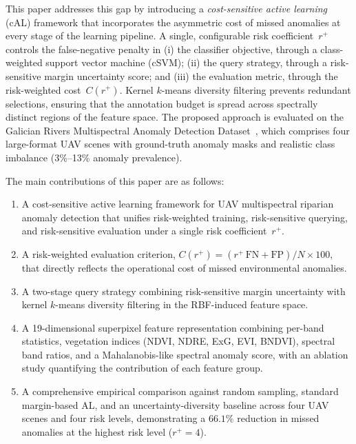 \documentclass[lettersize,journal]{IEEEtran}
\begin{document}
This paper addresses this gap by introducing a \emph{cost-sensitive active
learning} (cAL) framework that incorporates the asymmetric cost of missed
anomalies at every stage of the learning pipeline. A single, configurable
risk coefficient~$r^{+}$ controls the false-negative penalty in (i) the
classifier objective, through a class-weighted support vector machine
(cSVM); (ii) the query strategy, through a risk-sensitive margin
uncertainty score; and (iii) the evaluation metric, through the
risk-weighted cost~$C(r^{+})$. Kernel $k$-means diversity filtering
prevents redundant selections, ensuring that the annotation budget is
spread across spectrally distinct regions of the feature space. The
proposed approach is evaluated on the Galician Rivers Multispectral
Anomaly Detection Dataset~\cite{galicianriversaddataset}, which comprises
four large-format UAV scenes with ground-truth anomaly masks and realistic
class imbalance (3\%--13\% anomaly prevalence).

The main contributions of this paper are as follows:
\begin{enumerate}
  \item A cost-sensitive active learning framework for UAV multispectral
        riparian anomaly detection that unifies risk-weighted training,
        risk-sensitive querying, and risk-sensitive evaluation under a
        single risk coefficient~$r^{+}$.
  \item A risk-weighted evaluation criterion,
        $C(r^{+}) = (r^{+}\,\mathrm{FN}+\mathrm{FP})/N\times 100$,
        that directly reflects the operational cost of missed environmental
        anomalies.
  \item A two-stage query strategy combining risk-sensitive margin
        uncertainty with kernel $k$-means diversity filtering in the
        RBF-induced feature space.
  \item A 19-dimensional superpixel feature representation combining
        per-band statistics, vegetation indices (NDVI, NDRE, ExG, EVI,
        BNDVI), spectral band ratios, and a Mahalanobis-like spectral
        anomaly score, with an ablation study quantifying the contribution
        of each feature group.
  \item A comprehensive empirical comparison against random sampling,
        standard margin-based AL, and an uncertainty-diversity baseline
        across four UAV scenes and four risk levels, demonstrating a
        $66.1\%$ reduction in missed anomalies at the highest risk
        level ($r^{+}=4$).
\end{enumerate}
\end{document}
